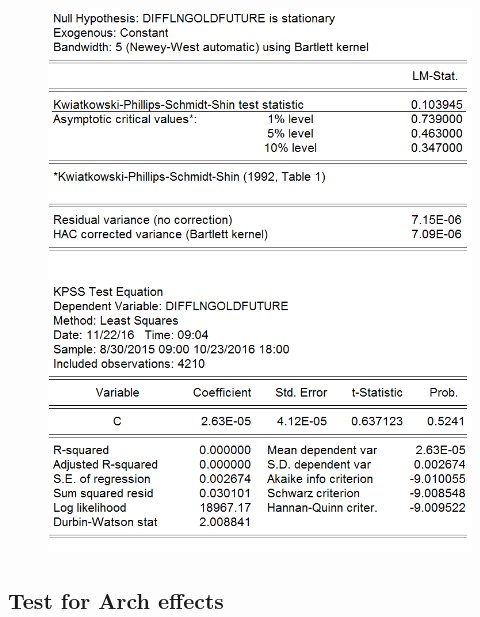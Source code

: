 \documentclass[11pt]{report}
\begin{document}
\begin{figure}[!h]
\centering
\includegraphics[scale=0.5]{Appendix/chap2/14}
\end{figure}
\clearpage

\subsection*{Test for Arch effects}
\end{document}
